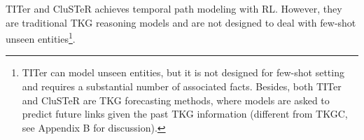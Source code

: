 \documentclass[runningheads]{llncs}
\begin{document}
TITer \cite{DBLP:conf/emnlp/SunZMH021} and CluSTeR \cite{DBLP:conf/acl/LiJGLGWC20} achieves temporal path modeling with RL. 
However, they are traditional TKG reasoning models and are not designed to deal with few-shot unseen entities\footnote{TITer can model unseen entities, but it is not designed for few-shot setting and requires a substantial number of associated facts. Besides, both TITer and CluSTeR are TKG forecasting methods, where models are asked to predict future links given the past TKG information (different from TKGC, see Appendix B for discussion).}. 
\end{document}
